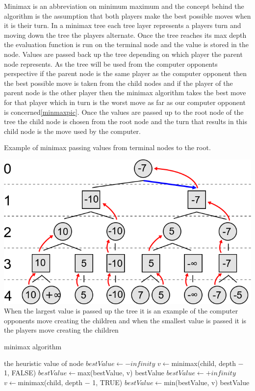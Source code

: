 \documentclass[final]{cmpreport}
\begin{document}
Minimax is an abbreviation on minimum maximum and the concept behind the algorithm is the assumption that both players make the best possible moves when it is their turn. In a minimax tree each tree layer represents a players turn and moving down the tree the players alternate. Once the tree reaches its max depth the evaluation function is run on the terminal node and the value is stored in the node. Values are passed back up the tree depending on which player the parent node represents. As the tree will be used from the computer opponents perspective if the parent node is the same player as the computer opponent then the best possible move is taken from the child nodes and if the player of the parent node is the other player then the minimax algorithm takes the best move for that player which in turn is the worst move as far as our computer opponent is concerned\ref{minmaxpic}. Once the values are passed up to the root node of the tree the child node is chosen from the root node and the turn that results in this child node is the move used by the computer.
\begin{cmpfigure}[!htb]{Example of minimax passing values from terminal nodes to the root.\label{minmaxpic}}
	
	\includegraphics[scale=0.5]{Minimax.png}
	\\When the largest value is passed up the tree it is an example of the computer opponents move creating the children and when the smallest value is passed it is the players move creating the children
\end{cmpfigure}
\begin{cmpfigure}[htb]{minimax algorithm\label{minmaxalg}}
\begin{algorithmic}
\Return the heuristic value of node
\EndIf
{}
\State $bestValue\gets-infinity$
\State $v\gets$minimax(child, depth $-$ 1, FALSE)
\State $bestValue\gets$max(bestValue, v)
\EndFor
\space\Return bestValue
\Else
\State $bestValue\gets+infinity$
\State $v\gets$minimax(child, depth $-$ 1, TRUE)
\State $bestValue\gets$min(bestValue, v)
\EndFor
\space\Return bestValue
\EndIf
\EndFunction
\end{algorithmic}
\end{cmpfigure}
\end{document}
